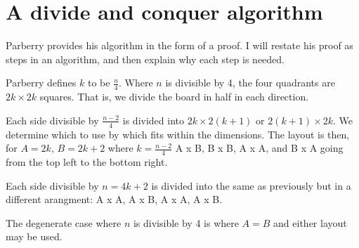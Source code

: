 \documentclass[11pt, a4paper]{article}
\begin{document}
\section{A divide and conquer algorithm}

Parberry provides his algorithm in the form of a proof. I will restate his proof as steps in an algorithm, and then explain why each step is needed.

Parberry defines $k$ to be $\frac{n}{4}$.
Where $n$ is divisible by 4, the four quadrants are $2k \times 2k$ squares. That is, we divide the board in half in each direction.

Each side divisible by $\frac{n - 2}{4}$ is divided into $2k \times 2(k + 1)$ or $2(k + 1) \times 2k$. We determine which to use by which fits within the dimensions. The layout is then, for $A = 2k$, $B = 2k + 2$ where $k = \frac{n - 2}{4}$ A x B, B x B, A x A, and B x A going from the top left to the bottom right.

Each side divisible by $n = 4k + 2$ is divided into the same as previously but in a different arangment: A x A, A x B, A x A, A x B.

The degenerate case where $n$ is divisible by 4 is where $A = B$ and either layout may be used.



\end{document}

